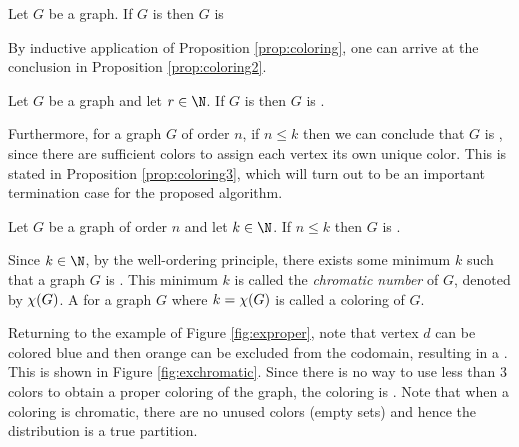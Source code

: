 \begin{proposition}
  \label{prop:coloring}
  Let \(G\) be a graph.  If \(G\) is  then \(G\) is 
\end{proposition}

By inductive application of Proposition \ref{prop:coloring}, one can arrive at the conclusion in Proposition
\ref{prop:coloring2}.

\begin{proposition}
  \label{prop:coloring2}
  Let \(G\) be a graph and let \(r\in\N\).  If \(G\) is  then \(G\) is .
\end{proposition}

Furthermore, for a graph \(G\) of order \(n\), if \(n\le k\) then we can conclude that \(G\) is ,
since there are sufficient colors to assign each vertex its own unique color.  This is stated in Proposition
\ref{prop:coloring3}, which will turn out to be an important termination case for the proposed algorithm.

\begin{proposition}
  \label{prop:coloring3}
  Let \(G\) be a graph of order \(n\) and let \(k\in\N\).  If \(n\le k\) then \(G\) is .
\end{proposition}

Since \(k\in\N\), by the well-ordering principle, there exists some minimum \(k\) such that a graph \(G\) is
.  This minimum \(k\) is called the \emph{chromatic number} of \(G\), denoted by \(\chi(G)\).  A
 for a graph \(G\) where \(k=\chi(G)\) is called a \emph{} coloring of \(G\).

Returning to the example  of Figure \ref{fig:exproper}, note that vertex \(d\) can be colored blue and
then orange can be excluded from the codomain, resulting in a .  This is shown in Figure
\ref{fig:exchromatic}.  Since there is no way to use less than 3 colors to obtain a proper coloring of the graph,
the coloring is .  Note that when a coloring is chromatic, there are no unused colors (empty sets) and
hence the distribution is a true partition.

